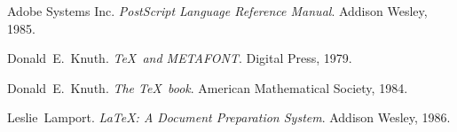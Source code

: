 \begin{thebibliography}{xx}

Adobe Systems Inc.
{\it PostScript Language Reference Manual}.
Addison Wesley, 1985.

Donald~E.~Knuth.
{\it \TeX\ and METAFONT}.
Digital Press, 1979.

Donald~E.~Knuth.
{\it The \TeX\ book}.
American Mathematical Society, 1984.

Leslie~Lamport.
{\it \LaTeX: A Document Preparation System}.
Addison Wesley, 1986.

\end{thebibliography}


